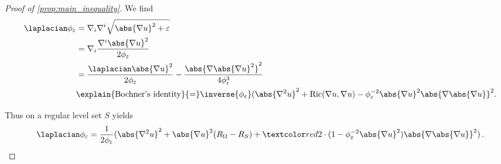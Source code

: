 \documentclass[titlepage,numbers=noenddot,oneside,%
cleardoublepage=empty,paper=a4,fontsize=11pt,%
english,%
]{scrartcl}
\newcommand*{\mathfullstop}{\,.}
\newcommand{\Ricci}{\mathrm{Ric}} %
\begin{document}
{\begin{proof}[Proof of \cref{prop:main_inequality}]
            We find
            \begin{equation}\label{eq:main_inequality_applied_bochner}
                \begin{aligned}[b]
                    \laplacian \phi_\varepsilon & =\nabla_i \nabla^i \sqrt{\abs{\nabla u}^2+\varepsilon}                                                                                                                             \\
                                                & =\nabla_i \frac{\nabla^i \abs{\nabla u}^2}{2\phi_\varepsilon}                                                                                                                      \\
                                                & =\frac{\laplacian \abs{\nabla u}^2}{2\phi_\varepsilon}-\frac{\abs{\nabla\abs{\nabla u}^2}^2}{4\phi_\varepsilon^3}                                                                  \\
                                                & \explain{\text{Bochner's identity}}{=}\inverse{\phi_\varepsilon}(\abs{\nabla^2 u}^2+\Ricci(\nabla u,\nabla u)-\phi_\varepsilon^{-2}\abs{\nabla u}^2\abs{\nabla \abs{\nabla u}}^2.
                \end{aligned}
            \end{equation}
            
            Thus on a regular level set \( S \) \cite[Lemma 4.1]{brayHarmonicFunctionsMass2019} yields
            \begin{equation}
                \laplacian \phi_{\varepsilon}=
                \frac{1}{2\phi_{\varepsilon}}(\abs{\nabla^2 u}^2+\abs{\nabla u}^2(R_\Omega-R_S)+\additionalTerms{ 2 \cdot (1-\phi_\varepsilon^{-2}\abs{\nabla u}^2)\abs{\nabla \abs{\nabla u}}^2})\mathfullstop\label{eq:main_equality_applied_main_identity}
            \end{equation}
            

\end{proof}}
\end{document}

